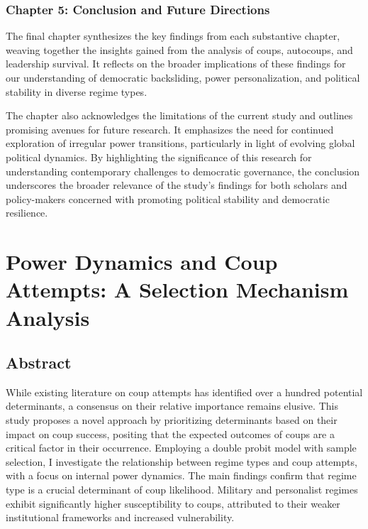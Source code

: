 \documentclass[
  12pt,
]{report}
\begin{document}
\subsection*{Chapter 5: Conclusion and Future
Directions}\label{chapter-5-conclusion-and-future-directions}

The final chapter synthesizes the key findings from each substantive
chapter, weaving together the insights gained from the analysis of
coups, autocoups, and leadership survival. It reflects on the broader
implications of these findings for our understanding of democratic
backsliding, power personalization, and political stability in diverse
regime types.

The chapter also acknowledges the limitations of the current study and
outlines promising avenues for future research. It emphasizes the need
for continued exploration of irregular power transitions, particularly
in light of evolving global political dynamics. By highlighting the
significance of this research for understanding contemporary challenges
to democratic governance, the conclusion underscores the broader
relevance of the study's findings for both scholars and policy-makers
concerned with promoting political stability and democratic resilience.

\chapter{Power Dynamics and Coup Attempts: A Selection Mechanism
Analysis}\label{sec-chapter2}

\section*{Abstract}\label{abstract-1}

While existing literature on coup attempts has identified over a hundred
potential determinants, a consensus on their relative importance remains
elusive. This study proposes a novel approach by prioritizing
determinants based on their impact on coup success, positing that the
expected outcomes of coups are a critical factor in their occurrence.
Employing a double probit model with sample selection, I investigate the
relationship between regime types and coup attempts, with a focus on
internal power dynamics. The main findings confirm that regime type is a
crucial determinant of coup likelihood. Military and personalist regimes
exhibit significantly higher susceptibility to coups, attributed to
their weaker institutional frameworks and increased vulnerability.
\end{document}
